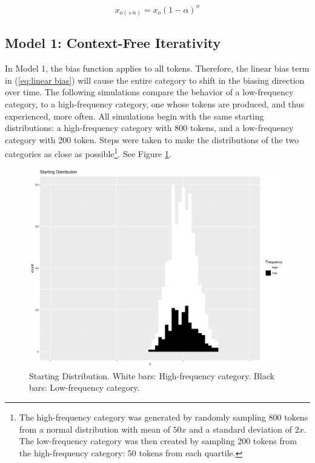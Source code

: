 \begin{equation}
x_{o(+n)}=x_{o}\left(1-\alpha\right)^{n}\label{eq:linear bias}
\end{equation}


\subsection{\label{subsec:Model-1:-Context-Free}Model 1: Context-Free Iterativity}

In Model 1, the bias function applies to all tokens. Therefore, the
linear bias term in (\ref{eq:linear bias}) will cause the entire
category to shift in the biasing direction over time. The following
simulations compare the behavior of a low-frequency category, to a
high-frequency category, one whose tokens are produced, and thus experienced,
more often. All simulations begin with the same starting distributions:
a high-frequency category with 800 tokens, and a low-frequency category
with 200 token. Steps were taken to make the distributions of the
two categories as close as possible\footnote{The high-frequency category was generated by randomly sampling 800
tokens from a normal distribution with mean of $50x$ and a standard
deviation of $2x$. The low-frequency category was then created by
sampling 200 tokens from the high-frequency category: 50 tokens from
each quartile.}. See Figure \ref{fig:Frequency Starting Dist}. 

\begin{figure}[H]

\centering{}\includegraphics[scale=0.3]{figures/startCon.pdf}\caption{\label{fig:Frequency Starting Dist}Starting Distribution. White bars:
High-frequency category. Black bars: Low-frequency category. }
\end{figure}

